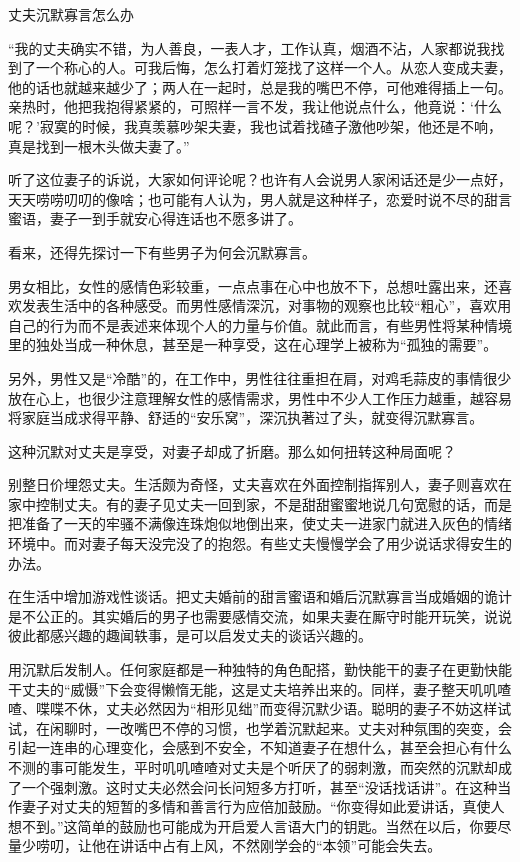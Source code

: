\documentclass[12pt,UTF8]{ctexbook}
\begin{document}
丈夫沉默寡言怎么办


“我的丈夫确实不错，为人善良，一表人才，工作认真，烟酒不沾，人家都说我找到了一个称心的人。可我后悔，怎么打着灯笼找了这样一个人。从恋人变成夫妻，他的话也就越来越少了；两人在一起时，总是我的嘴巴不停，可他难得插上一句。亲热时，他把我抱得紧紧的，可照样一言不发，我让他说点什么，他竟说：‘什么呢？’寂寞的时候，我真羡慕吵架夫妻，我也试着找碴子激他吵架，他还是不响，真是找到一根木头做夫妻了。”

听了这位妻子的诉说，大家如何评论呢？也许有人会说男人家闲话还是少一点好，天天唠唠叨叨的像啥；也可能有人认为，男人就是这种样子，恋爱时说不尽的甜言蜜语，妻子一到手就安心得连话也不愿多讲了。

看来，还得先探讨一下有些男子为何会沉默寡言。

男女相比，女性的感情色彩较重，一点点事在心中也放不下，总想吐露出来，还喜欢发表生活中的各种感受。而男性感情深沉，对事物的观察也比较“粗心”，喜欢用自己的行为而不是表述来体现个人的力量与价值。就此而言，有些男性将某种情境里的独处当成一种休息，甚至是一种享受，这在心理学上被称为“孤独的需要”。

另外，男性又是“冷酷”的，在工作中，男性往往重担在肩，对鸡毛蒜皮的事情很少放在心上，也很少注意理解女性的感情需求，男性中不少人工作压力越重，越容易将家庭当成求得平静、舒适的“安乐窝”，深沉执著过了头，就变得沉默寡言。

这种沉默对丈夫是享受，对妻子却成了折磨。那么如何扭转这种局面呢？

别整日价埋怨丈夫。生活颇为奇怪，丈夫喜欢在外面控制指挥别人，妻子则喜欢在家中控制丈夫。有的妻子见丈夫一回到家，不是甜甜蜜蜜地说几句宽慰的话，而是把准备了一天的牢骚不满像连珠炮似地倒出来，使丈夫一进家门就进入灰色的情绪环境中。而对妻子每天没完没了的抱怨。有些丈夫慢慢学会了用少说话求得安生的办法。

在生活中增加游戏性谈话。把丈夫婚前的甜言蜜语和婚后沉默寡言当成婚姻的诡计是不公正的。其实婚后的男子也需要感情交流，如果夫妻在厮守时能开玩笑，说说彼此都感兴趣的趣闻轶事，是可以启发丈夫的谈话兴趣的。

用沉默后发制人。任何家庭都是一种独特的角色配搭，勤快能干的妻子在更勤快能干丈夫的“威慑”下会变得懒惰无能，这是丈夫培养出来的。同样，妻子整天叽叽喳喳、喋喋不休，丈夫必然因为“相形见绌”而变得沉默少语。聪明的妻子不妨这样试试，在闲聊时，一改嘴巴不停的习惯，也学着沉默起来。丈夫对种氛围的突变，会引起一连串的心理变化，会感到不安全，不知道妻子在想什么，甚至会担心有什么不测的事可能发生，平时叽叽喳喳对丈夫是个听厌了的弱刺激，而突然的沉默却成了一个强刺激。这时丈夫必然会问长问短多方打听，甚至“没话找话讲”。在这种当作妻子对丈夫的短暂的多情和善言行为应倍加鼓励。“你变得如此爱讲话，真使人想不到。”这简单的鼓励也可能成为开启爱人言语大门的钥匙。当然在以后，你要尽量少唠叨，让他在讲话中占有上风，不然刚学会的“本领”可能会失去。
\end{document}
